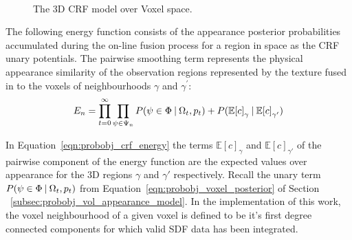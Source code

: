 \begin{figure}[!htbp]
{
  }
  \caption[3D CRF over Voxels]
  {The 3D CRF model over Voxel space.}
~\label{figure:probobj_crf}
\end{figure}

The following energy function consists of the appearance posterior probabilities
accumulated during the on-line fusion process for a region in space as the
CRF unary potentials. The pairwise smoothing term represents the physical
appearance similarity of the observation regions represented by the
texture fused in to the voxels of neighbourhoods \( \gamma \) and \( \gamma^{'} \):
\begin{equation}
  \label{eqn:probobj_crf_energy}
  E_{n} = \prod_{t=0}^{\infty} \prod_{\psi \in \Psi_{n}}
  P(\psi \in \Phi \:\vert\: \Omega_{t}, p_{t}) +
  P(\mathbb{E}{[c]}_{\gamma} \:\vert\: \mathbb{E}{[c]}_{\gamma'})
\end{equation}

In Equation~\ref{eqn:probobj_crf_energy} the terms \(\mathbb{E}{[c]}_{\gamma}\) and
\(\mathbb{E}{[c]}_{\gamma'}\) of the pairwise component of the energy function are
the expected values over appearance for the 3D regions \( \gamma \) and \( \gamma' \)
respectively. Recall the unary term \(P(\psi \in \Phi \:\vert\: \Omega_{t}, p_{t})\)
from Equation~\ref{eqn:probobj_voxel_posterior} of Section
~\ref{subsec:probobj_vol_appearance_model}. In the implementation of this work, the 
voxel neighbourhood of a given voxel is defined to be it's first degree connected 
components for which valid SDF data has been integrated.

